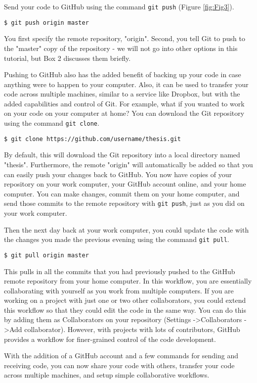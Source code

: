 Send your code to GitHub using the command \verb|git push| (Figure \ref{fig:Fig3}).

\begin{lstlisting}
$ git push origin master
\end{lstlisting}

You first specify the remote repository, "origin".
Second, you tell Git to push to the "master" copy of the repository - we will not go into other options in this tutorial, but Box 2 discusses them briefly.

Pushing to GitHub also has the added benefit of backing up your code in case anything were to happen to your computer.
Also, it can be used to transfer your code across multiple machines, similar to a service like Dropbox, but with the added capabilities and control of Git.
For example, what if you wanted to work on your code on your computer at home?
You can download the Git repository using the command \verb|git clone|.

\begin{lstlisting}
$ git clone https://github.com/username/thesis.git
\end{lstlisting}

By default, this will download the Git repository into a local directory named "thesis".
Furthermore, the remote "origin" will automatically be added so that you can easily push your changes back to GitHub.
You now have copies of your repository on your work computer, your GitHub account online, and your home computer.
You can make changes, commit them on your home computer, and send those commits to the remote repository with \verb|git push|, just as you did on your work computer.

Then the next day back at your work computer, you could update the code with the changes you made the previous evening using the command \verb|git pull|.

\begin{lstlisting}
$ git pull origin master
\end{lstlisting}

This pulls in all the commits that you had previously pushed to the GitHub remote repository from your home computer.
In this workflow, you are essentially collaborating with yourself as you work from multiple computers.
If you are working on a project with just one or two other collaborators, you could extend this workflow so that they could edit the code in the same way.
You can do this by adding them as Collaborators on your repository (Settings -\textgreater Collaborators -\textgreater Add collaborator).
However, with projects with lots of contributors, GitHub provides a workflow for finer-grained control of the code development.

With the addition of a GitHub account and a few commands for sending and receiving code, you can now share your code with others, transfer your code across multiple machines, and setup simple collaborative workflows.
  
  